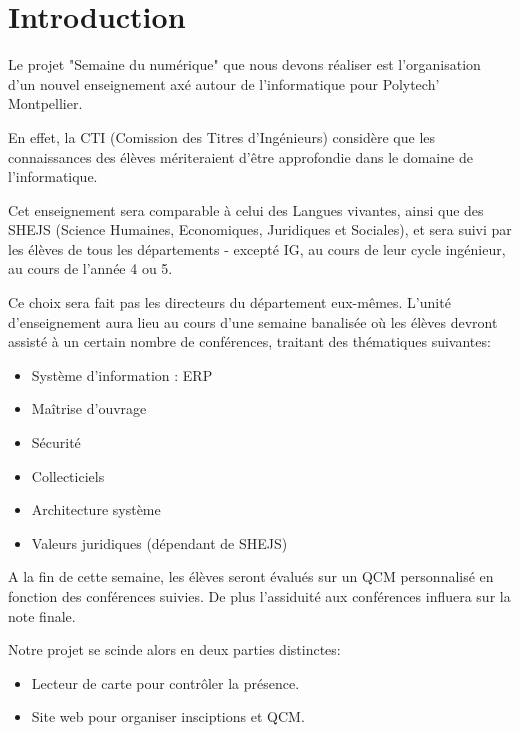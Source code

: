 \chapter{Introduction}
Le projet "Semaine du numérique" que nous devons réaliser est l’organisation
d'un nouvel enseignement axé autour de l'informatique pour Polytech' Montpellier.

En effet, la CTI (Comission des Titres d'Ingénieurs) considère que les 
connaissances des élèves mériteraient d'être approfondie dans le domaine de l'informatique.

Cet enseignement sera comparable à celui des Langues vivantes, ainsi que des
SHEJS (Science Humaines, Economiques, Juridiques et Sociales), et sera suivi
par les élèves de tous les départements - excepté IG, au cours de leur cycle 
ingénieur, au cours de l'année 4 ou 5.

Ce choix sera fait pas les directeurs du département eux-mêmes. L'unité 
d'enseignement aura lieu au cours d'une semaine banalisée où les élèves 
devront assisté à un certain nombre de conférences, traitant des thématiques 
suivantes:

\begin{itemize}
\item Système d’information : ERP
\item Maîtrise d’ouvrage
\item Sécurité
\item Collecticiels
\item Architecture système
\item Valeurs juridiques (dépendant de SHEJS)
\end{itemize}

A la fin de cette semaine, les élèves seront évalués sur un QCM personnalisé 
en fonction des conférences suivies. De plus l'assiduité aux conférences influera
sur la note finale.

Notre projet se scinde alors en deux parties distinctes:
\begin{itemize}
\item Lecteur de carte pour contrôler la présence.
\item Site web pour organiser insciptions et QCM.
\end{itemize}
